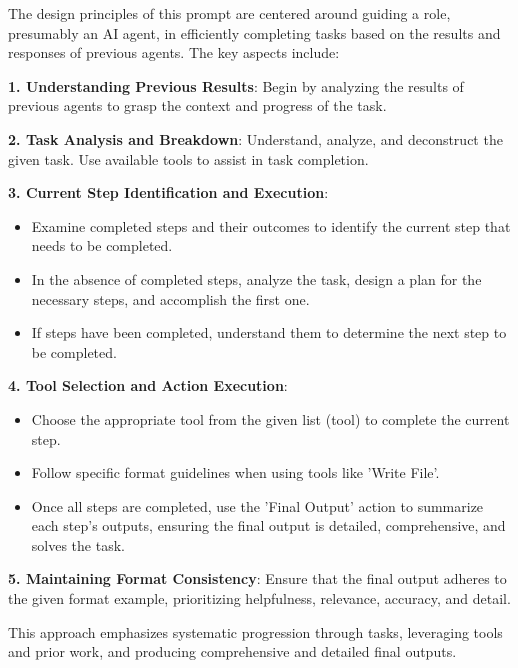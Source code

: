 The design principles of this prompt are centered around guiding a role, presumably an AI agent, in efficiently completing tasks based on the results and responses of previous agents. The key aspects include:

\textbf{1. Understanding Previous Results}: Begin by analyzing the results of previous agents to grasp the context and progress of the task.

\textbf{2. Task Analysis and Breakdown}: Understand, analyze, and deconstruct the given task. Use available tools to assist in task completion.

\textbf{3. Current Step Identification and Execution}:
\begin{itemize}
    \item Examine completed steps and their outcomes to identify the current step that needs to be completed.
    \item In the absence of completed steps, analyze the task, design a plan for the necessary steps, and accomplish the first one.
    \item If steps have been completed, understand them to determine the next step to be completed.
\end{itemize}

\textbf{4. Tool Selection and Action Execution}:
\begin{itemize}
    \item Choose the appropriate tool from the given list ({tool}) to complete the current step.
    \item Follow specific format guidelines when using tools like 'Write File'.
    \item Once all steps are completed, use the 'Final Output' action to summarize each step's outputs, ensuring the final output is detailed, comprehensive, and solves the task.
\end{itemize}

\textbf{5. Maintaining Format Consistency}: Ensure that the final output adheres to the given format example, prioritizing helpfulness, relevance, accuracy, and detail.

This approach emphasizes systematic progression through tasks, leveraging tools and prior work, and producing comprehensive and detailed final outputs.

